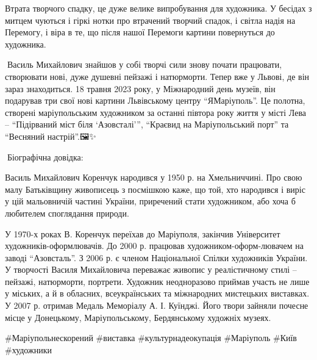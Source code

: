 Втрата творчого спадку, це дуже велике випробування для художника. У бесідах з
митцем чуються і гіркі нотки про втрачений творчий спадок, і світла надія на
Перемогу, і віра в те, що після нашої Перемоги картини повернуться до
художника. 

👏Василь Михайлович знайшов у собі творчі сили знову почати працювати,
створювати нові, дуже душевні пейзажі і натюрморти. Тепер вже у Львові, де він
зараз знаходиться. 18 травня 2023 року, у Міжнародний день музеїв, він
подарував три свої нові картини Львівському центру \enquote{ЯМаріуполь}. Це полотна,
створені маріупольським художником за останні півтора року життя у місті Лева –
\enquote{Підірваний міст біля \enquote{Азовсталі}}, \enquote{Краєвид на Маріупольський порт} та
\enquote{Весняний настрій}.🖼✨️

📍Біографічна довідка:

Василь Михайлович Коренчук народився у 1950 р. на Хмельниччині. Про свою малу
Батьківщину живописець з посмішкою каже, що той, хто народився і виріс у цій
мальовничій частині України, приречений стати художником, або хоча б любителем
споглядання природи.

У 1970-х роках В. Коренчук переїхав до Маріуполя, закінчив Університет
художників-оформлювачів. До 2000 р. працював художником-оформ\hyp{}лювачем на заводі
\enquote{Азовсталь}. З 2006 р. є членом Національної Спілки художників України. У
творчості Василя Михайловича переважає живопис у реалістичному стилі – пейзажі,
натюрморти, портрети. Художник неодноразово приймав участь не лише у міських, а
й в обласних, всеукраїнських та міжнародних мистецьких виставках. У 2007 р.
отримав Медаль Меморіалу А. І. Куїнджі. Його твори зайняли почесне місце у
Донецькому, Маріупольському, Бердянському художніх музеях.

\#Маріупольнескорений \#виставка \#культурнадеокупація \#Маріуполь \#Київ \#художники
